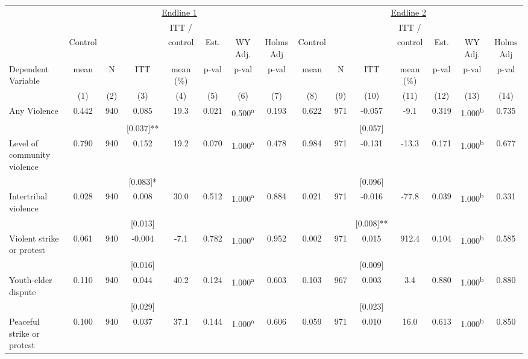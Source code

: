 \begin{tabular}{lcccccccccccccc}
\hline \noalign{\smallskip} & \multicolumn{7}{c}{\uline{\hfill Endline 1 \hfill}} & \multicolumn{7}{c}{\uline{\hfill Endline 2 \hfill}}\\
 &  &  &  & ITT / &  &  &  &  &  &  & ITT / &  &  & \\
 & Control &  &  & control & Est. & WY Adj. & Holms Adj & Control &  &  & control & Est. & WY Adj. & Holms Adj\\
Dependent Variable & mean & N & ITT & mean (\%) & p-val & p-val & p-val & mean & N & ITT & mean (\%) & p-val & p-val & p-val\\
 & (1) & (2) & (3) & (4) & (5) & (6) & (7) & (8) & (9) & (10) & (11) & (12) & (13) & (14)\\
\noalign{\smallskip}\hline \noalign{\smallskip}Any Violence & 0.442 & 940 & 0.085 & 19.3 & 0.021 & 0.500\textsuperscript{a} & 0.193 & 0.622 & 971 & -0.057 & -9.1 & 0.319 & 1.000\textsuperscript{b} & 0.735\\
 &  &  & [0.037]** &  &  &  &  &  &  & [0.057] &  &  &  & \\
Level of community violence & 0.790 & 940 & 0.152 & 19.2 & 0.070 & 1.000\textsuperscript{a} & 0.478 & 0.984 & 971 & -0.131 & -13.3 & 0.171 & 1.000\textsuperscript{b} & 0.677\\
 &  &  & [0.083]* &  &  &  &  &  &  & [0.096] &  &  &  & \\
\quad Intertribal violence & 0.028 & 940 & 0.008 & 30.0 & 0.512 & 1.000\textsuperscript{a} & 0.884 & 0.021 & 971 & -0.016 & -77.8 & 0.039 & 1.000\textsuperscript{b} & 0.331\\
 &  &  & [0.013] &  &  &  &  &  &  & [0.008]** &  &  &  & \\
\quad Violent strike or protest & 0.061 & 940 & -0.004 & -7.1 & 0.782 & 1.000\textsuperscript{a} & 0.952 & 0.002 & 971 & 0.015 & 912.4 & 0.104 & 1.000\textsuperscript{b} & 0.585\\
 &  &  & [0.016] &  &  &  &  &  &  & [0.009] &  &  &  & \\
\quad Youth-elder dispute & 0.110 & 940 & 0.044 & 40.2 & 0.124 & 1.000\textsuperscript{a} & 0.603 & 0.103 & 967 & 0.003 & 3.4 & 0.880 & 1.000\textsuperscript{b} & 0.880\\
 &  &  & [0.029] &  &  &  &  &  &  & [0.023] &  &  &  & \\
\quad Peaceful strike or protest & 0.100 & 940 & 0.037 & 37.1 & 0.144 & 1.000\textsuperscript{a} & 0.606 & 0.059 & 971 & 0.010 & 16.0 & 0.613 & 1.000\textsuperscript{b} & 0.850\\

\end{tabular}
